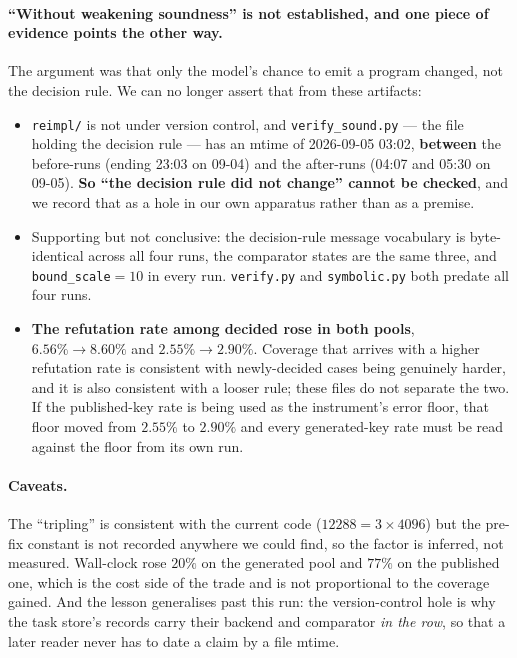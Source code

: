 \paragraph{``Without weakening soundness'' is not established, and one piece of evidence points
the other way.} The argument was that only the model's chance to emit a program changed, not
the decision rule. We can no longer assert that from these artifacts:
\begin{itemize}
\item \texttt{reimpl/} is not under version control, and \texttt{verify\_sound.py} --- the file
holding the decision rule --- has an mtime of 2026-09-05 03:02, \textbf{between} the before-runs
(ending 23:03 on 09-04) and the after-runs (04:07 and 05:30 on 09-05). \textbf{So ``the
decision rule did not change'' cannot be checked}, and we record that as a hole in our own
apparatus rather than as a premise.
\item Supporting but not conclusive: the decision-rule message vocabulary is byte-identical
across all four runs, the comparator states are the same three, and \texttt{bound\_scale}$=10$
in every run. \texttt{verify.py} and \texttt{symbolic.py} both predate all four runs.
\item \textbf{The refutation rate among decided rose in both pools}, $6.56\% \to 8.60\%$ and
$2.55\% \to 2.90\%$. Coverage that arrives with a higher refutation rate is consistent with
newly-decided cases being genuinely harder, and it is also consistent with a looser rule; these
files do not separate the two. If the published-key rate is being used as the instrument's
error floor, that floor moved from $2.55\%$ to $2.90\%$ and every generated-key rate must be
read against the floor from its own run.
\end{itemize}

\paragraph{Caveats.} The ``tripling'' is consistent with the current code
($12288 = 3 \times 4096$) but the pre-fix constant is not recorded anywhere we could find, so
the factor is inferred, not measured. Wall-clock rose $20\%$ on the generated pool and $77\%$
on the published one, which is the cost side of the trade and is not proportional to the
coverage gained. And the lesson generalises past this run: the version-control hole is why the
task store's records carry their backend and comparator \emph{in the row}, so that a later
reader never has to date a claim by a file mtime.

